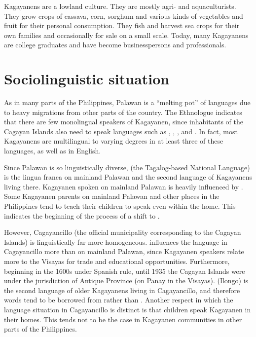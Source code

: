 Kagayanens are a lowland culture. They are mostly agri- and aquaculturists. They grow crops of cassava, corn, sorghum and various kinds of vegetables and fruit for their personal consumption. They fish and harvest sea crops for their own families and occasionally for sale on a small scale. Today, many Kagayanens are college graduates and have become businesspersons and professionals.
\section{Sociolinguistic situation}\label{sec:1.3} \label{sec:sociolinguisticsituation}

As in many parts of the Philippines, Palawan is a “melting pot” of languages due to heavy migrations from other parts of the country. The Ethnologue \citep{eberhard2023} indicates that there are few monolingual speakers of Kagayanen, since inhabitants of the Cagayan Islands also need to speak languages such as , , ,  and . In fact, most Kagayanens are multilingual to varying degrees in at least three of these languages, as well as in English. 

Since Palawan is so linguistically diverse,  (the Tagalog-based National Language) is the lingua franca on mainland Palawan and the second language of Kagayanens living there. Kagayanen spoken on mainland Palawan is heavily influenced by . Some Kagayanen parents on mainland Palawan and other places in the Philippines tend to teach their children to speak  even within the home. This indicates the beginning of the process of a shift to .

However, Cagayancillo (the official municipality corresponding to the Cagayan Islands) is linguistically far more homogeneous.  influences the language in Cagayancillo more than on mainland Palawan, since Kagayanen speakers relate more to the Visayas for trade and educational opportunities. Furthermore, beginning in the 1600s under Spanish rule, until 1935 the Cagayan Islands were under the jurisdiction of Antique Province (on Panay in the Visayas).  (Ilongo) is the second language of older Kagayanens living in Cagayancillo, and therefore words tend to be borrowed from  rather than . Another respect in which the language situation in Cagayancillo is distinct is that children speak Kagayanen in their homes. This tends not to be the case in Kagayanen communities in other parts of the Philippines.

